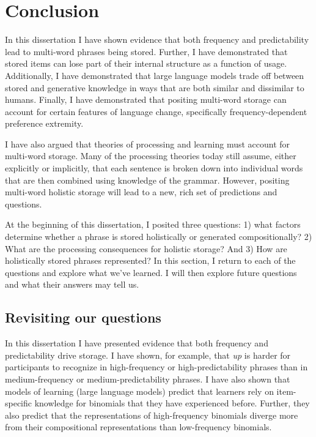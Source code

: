 \documentclass[
  12pt,
  letterpaper,
]{scrreprt}
\begin{document}

\chapter{Conclusion}\label{conclusion-4}

In this dissertation I have shown evidence that both frequency and
predictability lead to multi-word phrases being stored. Further, I have
demonstrated that stored items can lose part of their internal structure
as a function of usage. Additionally, I have demonstrated that large
language models trade off between stored and generative knowledge in
ways that are both similar and dissimilar to humans. Finally, I have
demonstrated that positing multi-word storage can account for certain
features of language change, specifically frequency-dependent preference
extremity.

I have also argued that theories of processing and learning must account
for multi-word storage. Many of the processing theories today still
assume, either explicitly or implicitly, that each sentence is broken
down into individual words that are then combined using knowledge of the
grammar. However, positing multi-word holistic storage will lead to a
new, rich set of predictions and questions.

At the beginning of this dissertation, I posited three questions: 1)
what factors determine whether a phrase is stored holistically or
generated compositionally? 2) What are the processing consequences for
holistic storage? And 3) How are holistically stored phrases
represented? In this section, I return to each of the questions and
explore what we've learned. I will then explore future questions and
what their answers may tell us.

\section{Revisiting our questions}\label{revisiting-our-questions}

In this dissertation I have presented evidence that both frequency and
predictability drive storage. I have shown, for example, that \emph{up}
is harder for participants to recognize in high-frequency or
high-predictability phrases than in medium-frequency or
medium-predictability phrases. I have also shown that models of learning
(large language models) predict that learners rely on item-specific
knowledge for binomials that they have experienced before. Further, they
also predict that the representations of high-frequency binomials
diverge more from their compositional representations than low-frequency
binomials.
\end{document}
